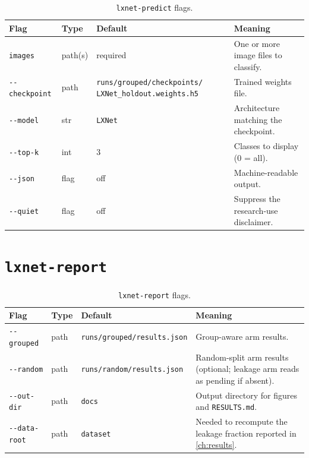\documentclass[11pt,a4paper,oneside]{report}
\newcommand{\code}[1]{\texttt{\small #1}}
\begin{document}
\begin{table}[h]
\centering
\small
\begin{tabularx}{\linewidth}{@{}lll X@{}}
\toprule
\textbf{Flag} & \textbf{Type} & \textbf{Default} & \textbf{Meaning} \\
\midrule
\code{images} & path(s) & required & One or more image files to classify. \\
\code{-{}-checkpoint} & path & \code{runs/grouped/checkpoints/}\linebreak
  \code{LXNet\_holdout.weights.h5} & Trained weights file. \\
\code{-{}-model} & str & \code{LXNet} & Architecture matching the checkpoint. \\
\code{-{}-top-k} & int & 3 & Classes to display (0 = all). \\
\code{-{}-json} & flag & off & Machine-readable output. \\
\code{-{}-quiet} & flag & off & Suppress the research-use disclaimer. \\
\bottomrule
\end{tabularx}
\caption{\texttt{lxnet-predict} flags.}
\label{tab:cli-predict}
\end{table}

\section{\code{lxnet-report}}

\begin{table}[h]
\centering
\small
\begin{tabularx}{\linewidth}{@{}lll X@{}}
\toprule
\textbf{Flag} & \textbf{Type} & \textbf{Default} & \textbf{Meaning} \\
\midrule
\code{-{}-grouped} & path & \code{runs/grouped/results.json} & Group-aware
  arm results. \\
\code{-{}-random} & path & \code{runs/random/results.json} & Random-split
  arm results (optional; leakage arm reads as pending if absent). \\
\code{-{}-out-dir} & path & \code{docs} & Output directory for figures and
  \texttt{RESULTS.md}. \\
\code{-{}-data-root} & path & \code{dataset} & Needed to recompute the
  leakage fraction reported in \cref{ch:results}. \\
\bottomrule
\end{tabularx}
\caption{\texttt{lxnet-report} flags.}
\label{tab:cli-report}
\end{table}
\end{document}
